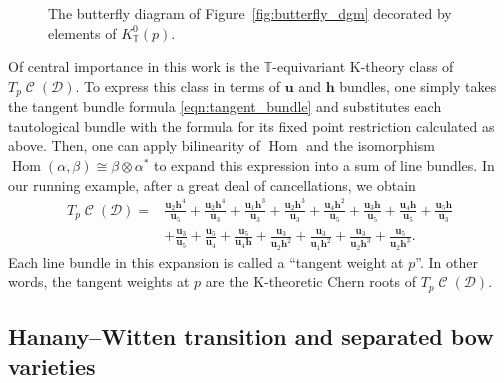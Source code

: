\documentclass[pdftex]{sigma}
\numberwithin{equation}{section}
\newcommand{\brane}{\mathcal D}
\newcommand{\torus}{\mathbb T}
\newcommand{\hb}{\mathbf h}
\newcommand{\ub}{\mathbf u}
\DeclareMathOperator{\bowvar}{\mathcal C}
\DeclareMathOperator{\Hom}{Hom}
\begin{document}
\begin{figure}[t]
\caption{The butterfly diagram of Figure~\ref{fig:butterfly_dgm} decorated by elements of $K^0_\torus(p)$.}
\label{fig:butterfly_mons}
\end{figure}

Of central importance in this work is the $\torus$-equivariant K-theory class of $T_p\bowvar(\brane)$. To express this class in terms of $\ub$ and $\hb$ bundles, one simply takes the tangent bundle formula \eqref{eqn:tangent_bundle} and substitutes each tautological bundle with the formula for its fixed point restriction calculated as above. Then, one can apply bilinearity of $\Hom$ and the isomorphism $\Hom(\alpha, \beta)\cong \beta\otimes\alpha^*$ to expand this expression into a sum of line bundles. In our running example, after a great deal of cancellations, we obtain
\begin{align}
T_p\bowvar(\brane) ={}& \frac{\ub_2\hb^4}{\ub_5} + \frac{\ub_2\hb^4}{\ub_3} + \frac{\ub_1\hb^3}{\ub_3} + \frac{\ub_2\hb^3}{\ub_3}
+ \frac{\ub_4\hb^2}{\ub_5} + \frac{\ub_3\hb}{\ub_5} + \frac{\ub_4\hb}{\ub_5} + \frac{\ub_5\hb}{\ub_3}\nonumber \\
& + \frac{\ub_3}{\ub_5}
+ \frac{\ub_5}{\ub_4} + \frac{\ub_5}{\ub_4\hb} + \frac{\ub_3}{\ub_2\hb^2} + \frac{\ub_3}{\ub_1\hb^2} + \frac{\ub_3}{\ub_2\hb^3}
+ \frac{\ub_5}{\ub_2\hb^3}.\label{eqn:cancel}
\end{align}
Each line bundle in this expansion is called a ``tangent weight at $p$''. In other words, the tangent weights at $p$ are the K-theoretic Chern roots of $T_p\bowvar(\brane)$.

\subsection{Hanany--Witten transition and separated bow varieties} \label{sec:HW}
\end{document}
